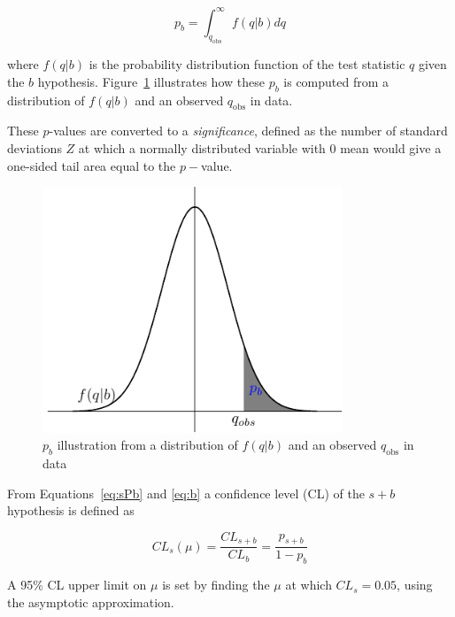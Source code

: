 \begin{equation}
p_{b} = \int_{q_{\text{obs}}}^\infty f(q|b)dq
\label{eq:b}
\end{equation}

where $f(q|b)$ is the probability distribution function of the test statistic $q$ given the $b$ 
hypothesis. Figure~\ref{fig:pVal} illustrates how these $p_{b}$ is computed from a distribution 
of $f(q|b)$ and an observed $q_{\text{obs}}$ in data. 

\par These $p$-values are converted to a {\it significance}, defined as the number 
of standard deviations $Z$ at which a normally distributed variable with 0 mean would give a 
one-sided tail area equal to the $p-$value. %

\begin{figure}[h]
\centering
   \includegraphics[width=0.8\textwidth]{figures/pVal_sPb.pdf}
\caption{$p_{b}$ illustration from a distribution 
of $f(q|b)$ and an observed $q_{\text{obs}}$ in data}
\label{fig:pVal}
\end{figure}

\par From Equations~\ref{eq:sPb} and \ref{eq:b} a confidence level (CL) of the $s+b$ hypothesis is 
defined as 
 
\begin{equation}
CL_s(\mu) = \frac{CL_{s+b}}{CL_b} = \frac{p_{s+b}}{1-p_b}
\label{eq:cls}
\end{equation}

A 95\% CL upper limit on $\mu$ is set by finding the $\mu$ at which $CL_s = 0.05$, using the 
asymptotic approximation. 
